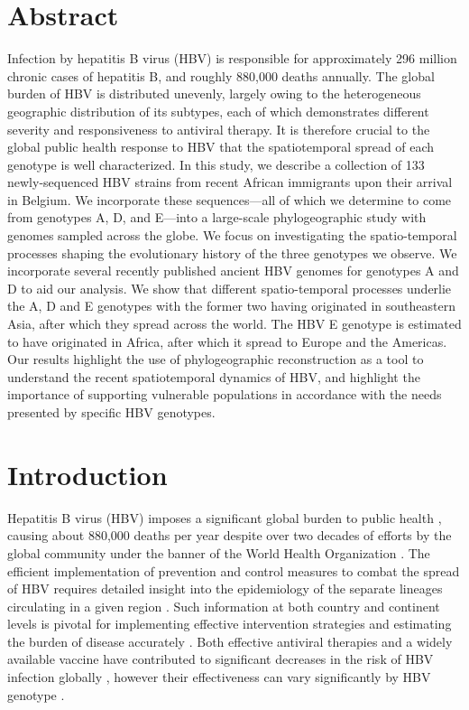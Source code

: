\section{Abstract}
Infection by hepatitis B virus (HBV) is responsible for approximately 296 million chronic cases of hepatitis B, and roughly 880,000 deaths annually.
The global burden of HBV is distributed unevenly, largely owing to the heterogeneous geographic distribution of its subtypes, each of which demonstrates different severity and responsiveness to antiviral therapy.
It is therefore crucial to the global public health response to HBV that the spatiotemporal spread of each genotype is well characterized.
In this study, we describe a collection of 133 newly-sequenced HBV strains from recent African immigrants upon their arrival in Belgium.
We incorporate these sequences---all of which we determine to come from genotypes A, D, and E---into a large-scale phylogeographic study with genomes sampled across the globe.
We focus on investigating the spatio-temporal processes shaping the evolutionary history of the three genotypes we observe.
We incorporate several recently published ancient HBV genomes for genotypes A and D to aid our analysis.
We show that different spatio-temporal processes underlie the A, D and E genotypes with the former two having originated in southeastern Asia, after which they spread across the world.
The HBV E genotype is estimated to have originated in Africa, after which it spread to Europe and the Americas.
Our results highlight the use of phylogeographic reconstruction as a tool to understand the recent spatiotemporal dynamics of HBV, and highlight the importance of supporting vulnerable populations in accordance with the needs presented by specific HBV genotypes.

\section{Introduction}
Hepatitis B virus (HBV) imposes a significant global burden to public health \cite{pourkarim2011molecular,malik2022viral}, causing about 880,000 deaths per year \cite{revill2020evolution} despite over two decades of efforts by the global community under the banner of the World Health Organization \cite{pourkarim2018iran}.
The efficient implementation of prevention and control measures to combat the spread of HBV requires detailed insight into the epidemiology of the separate lineages circulating in a given region \cite{schweitzer2015estimations,pourkarim2011guidelines}.
Such information at both country and continent levels is pivotal for implementing effective intervention strategies and estimating the burden of disease accurately \cite{pourkarim2011molecular}.
Both effective antiviral therapies and a widely available vaccine have contributed to significant decreases in the risk of HBV infection globally \cite{lu2020virus}, however their effectiveness can vary significantly by HBV genotype \cite{bottecchia2011detection}.\\


